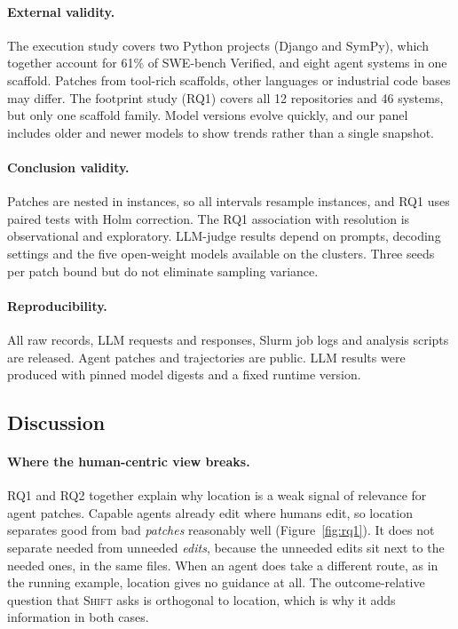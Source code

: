 \documentclass[a4paper,fleqn]{cas-sc}
\newcommand{\tool}{\textsc{Shift}}
\newcommand{\rqoneSystems}{46}
\begin{document}
\paragraph{External validity.} The execution study covers two Python projects (Django and SymPy), which together account for 61\% of SWE-bench Verified, and eight agent systems in one scaffold. Patches from tool-rich scaffolds, other languages or industrial code bases may differ. The footprint study (RQ1) covers all 12 repositories and \rqoneSystems{} systems, but only one scaffold family. Model versions evolve quickly, and our panel includes older and newer models to show trends rather than a single snapshot.

\paragraph{Conclusion validity.} Patches are nested in instances, so all intervals resample instances, and RQ1 uses paired tests with Holm correction. The RQ1 association with resolution is observational and exploratory. LLM-judge results depend on prompts, decoding settings and the five open-weight models available on the clusters. Three seeds per patch bound but do not eliminate sampling variance.

\paragraph{Reproducibility.} All raw records, LLM requests and responses, Slurm job logs and analysis scripts are released. Agent patches and trajectories are public. LLM results were produced with pinned model digests and a fixed runtime version.


\subsection{Discussion}\label{sec:discussion}

\paragraph{Where the human-centric view breaks.} RQ1 and RQ2 together explain why location is a weak signal of relevance for agent patches. Capable agents already edit where humans edit, so location separates good from bad \emph{patches} reasonably well (Figure~\ref{fig:rq1}). It does not separate needed from unneeded \emph{edits}, because the unneeded edits sit next to the needed ones, in the same files. When an agent does take a different route, as in the running example, location gives no guidance at all. The outcome-relative question that \tool{} asks is orthogonal to location, which is why it adds information in both cases.
\end{document}
